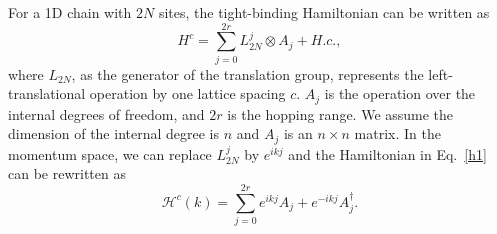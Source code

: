 \documentclass[aps,prl,twocolumn,noshowpacs,superscriptaddress]{revtex4-1}
\def \H {\mathcal{H}}
\begin{document}
For a 1D chain with $ 2N $ sites, the tight-binding Hamiltonian can be written as
\begin{equation}\label{h1}
	H^c=\sum_{j=0}^{2r}L_{2N}^{j}\otimes A_j+H.c.,
\end{equation}
where $ L_{2N} $, as the generator of the translation group, represents the left-translational operation by one lattice spacing $ c $. $ A_j $ is the operation over the internal degrees of freedom, and $ 2r $ is the hopping range. We assume the dimension of the internal degree is $ n $ and $ A_j $ is an $ n\times n $ matrix. In the momentum space, we can replace $ L_{2N}^{j} $ by $ e^{ikj} $ and the Hamiltonian in Eq.~\eqref{h1} can be rewritten as
\begin{equation}\label{Hck}
	\H^c(k)=\sum_{j=0}^{2r}e^{ikj}A_j+e^{-ikj}A_j^\dagger.
\end{equation}
\end{document}
